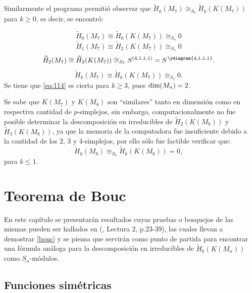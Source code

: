 \documentclass[12pt]{book}
\theoremstyle{definition}
\newcounter{in}
\begin{document}
Similarmente el programa permitió observar que $\widetilde H_{k}(M_{7})\cong_{S_7} \widetilde H_{k}(K(M_{7}))$ para $k\geq0$, es decir, se encontró:

\begin{equation}
  \widetilde H_{0}(M_{7})\cong\widetilde H_{0}(K(M_{7}))\cong_{S_{7}} 0
\end{equation}
\begin{equation}
  \widetilde H_{1}(M_{7})\cong\widetilde H_{2}(K(M_{7}))\cong_{S_{7}} 0
\end{equation}
\begin{equation}
  \widetilde H_{2}(M_{7})\cong\widetilde H_{2}(K(M_{7}))\cong_{S_{7}} S^{(4,1,1,1)} = S^{\,\ydiagram{4,1,1,1}}.
\end{equation}
\begin{equation}
\label{eq:114}
  \widetilde H_{k}(M_{7})\cong\widetilde H_{k}(K(M_{7}))\cong_{S_{7}} 0.
\end{equation}
Se tiene que \ref{eq:114} es cierta para $k \geq 3$, pues $\textup{dim}(M_n) = 2$.

Se sabe que $K(M_{7})$ y $K(M_{8})$ son ``similares'' tanto en
dimensión como en respectiva cantidad de $p$-simplejos, sin embargo,
computacionalmente no fue posible determinar la descomposición en
irreducibles de $\widetilde H_{2}(K(M_{8}))$ y
$\widetilde H_{3}(K(M_{8}))$, ya que la memoria de la computadora fue
insuficiente debido a la cantidad de los $2$, $3$ y $4$-simplejos, por
ello sólo fue factible verificar que:
\begin{equation}
\widetilde H_{k}(M_{8})\cong_{S_{8}} \widetilde H_{k}(K(M_{8})) = 0, 
\end{equation}
para $k \leq 1.$

\chapter{Teorema de Bouc}
\label{summ}
En este capítulo se presentarán resultados cuyas pruebas o bosquejos
de las mismas pueden ser hallados en \normalfont(\cite{wachs2006poset},
Lectura 2, p.23-39), las cuales llevan a demostrar \ref{bouc} y se
piensa que servirán como punto de partida para encontrar una fórmula
análoga para la descomposición en irreducibles de
$\widetilde H_k(K(M_n))$ como $S_n$-módulos.



\section{Funciones simétricas}
\label{sim_fun}
\end{document}
